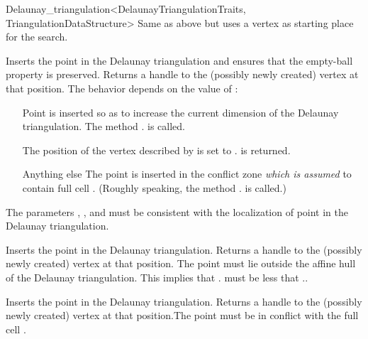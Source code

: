 \begin{ccRefClass}{Delaunay_triangulation<DelaunayTriangulationTraits, TriangulationDataStructure>}
%
{Same as above but uses a vertex as starting place for the search.}

\begin{ccAdvanced}

{Inserts the point  in the Delaunay triangulation
and ensures that the empty-ball property is preserved.
Returns a handle to the
(possibly newly created) vertex at that position. The behavior depends on the
value of :\begin{itemize} \item[\ccc{OUTSIDE_AFFINE_HULL}] Point
 is inserted so as to increase the current dimension of the Delaunay
triangulation. The method \ccVar. is called.
\item[\ccc{ON_VERTEX}] The position of the vertex  described by 
is set to .  is returned. \item[Anything else] The point 
is inserted in the conflict zone {\em which is assumed} to contain 
full cell
. (Roughly speaking, the method \ccVar.
is called.)\end{itemize} \ccPrecond The parameters , , 
and  must be consistent with the localization of point  in the
Delaunay triangulation.}

{Inserts the point  in the Delaunay triangulation. Returns a handle to the
(possibly newly created) vertex at that position. \ccPrecond The point 
must lie outside the affine hull of the Delaunay triangulation. This implies that
\ccVar. must be less that
\ccVar..}

{Inserts the point  in the Delaunay triangulation. Returns a handle to the
(possibly newly created) vertex at that position.\ccPrecond The point 
must be in conflict with the full cell .}

\end{ccAdvanced}




\end{ccRefClass}
